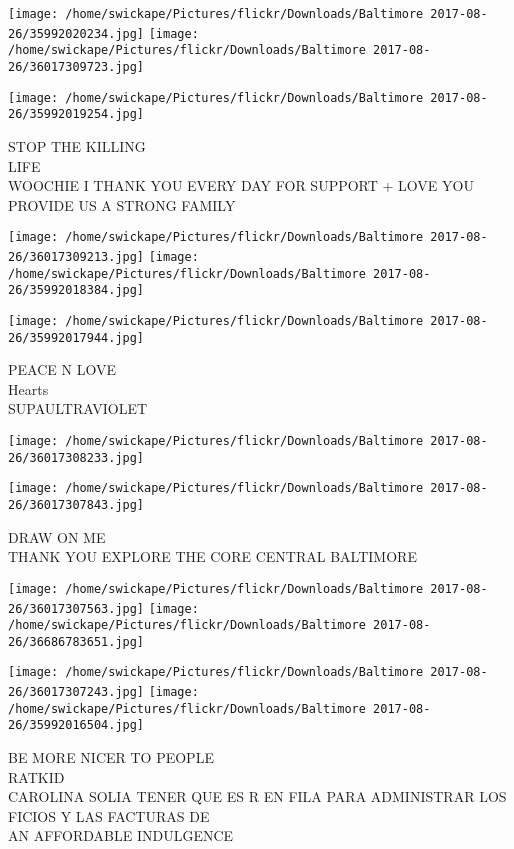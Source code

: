 \documentclass[10pt,letterpaper]{article}
\begin{document}
\texttt{[image: /home/swickape/Pictures/flickr/Downloads/Baltimore 2017-08-26/35992020234.jpg]}
\texttt{[image: /home/swickape/Pictures/flickr/Downloads/Baltimore 2017-08-26/36017309723.jpg]}

\vspace{0.25in}
\texttt{[image: /home/swickape/Pictures/flickr/Downloads/Baltimore 2017-08-26/35992019254.jpg]}

STOP THE KILLING\\
LIFE\\
WOOCHIE I THANK YOU EVERY DAY FOR SUPPORT + LOVE YOU PROVIDE US A STRONG FAMILY\\
\pagebreak

\texttt{[image: /home/swickape/Pictures/flickr/Downloads/Baltimore 2017-08-26/36017309213.jpg]}
\texttt{[image: /home/swickape/Pictures/flickr/Downloads/Baltimore 2017-08-26/35992018384.jpg]}

\texttt{[image: /home/swickape/Pictures/flickr/Downloads/Baltimore 2017-08-26/35992017944.jpg]}

PEACE N LOVE\\
Hearts\\
SUPAULTRAVIOLET\\
\pagebreak

\texttt{[image: /home/swickape/Pictures/flickr/Downloads/Baltimore 2017-08-26/36017308233.jpg]}

\vspace{0.25in}
\texttt{[image: /home/swickape/Pictures/flickr/Downloads/Baltimore 2017-08-26/36017307843.jpg]}

DRAW ON ME\\
THANK YOU EXPLORE THE CORE CENTRAL BALTIMORE\\
\pagebreak

\texttt{[image: /home/swickape/Pictures/flickr/Downloads/Baltimore 2017-08-26/36017307563.jpg]}
\texttt{[image: /home/swickape/Pictures/flickr/Downloads/Baltimore 2017-08-26/36686783651.jpg]}

\texttt{[image: /home/swickape/Pictures/flickr/Downloads/Baltimore 2017-08-26/36017307243.jpg]}
\texttt{[image: /home/swickape/Pictures/flickr/Downloads/Baltimore 2017-08-26/35992016504.jpg]}

BE MORE NICER TO PEOPLE\\
RATKID\\
CAROLINA SOLIA TENER QUE ES R EN FILA PARA ADMINISTRAR LOS FICIOS Y LAS FACTURAS DE\\
AN AFFORDABLE INDULGENCE\\
\pagebreak
\end{document}
